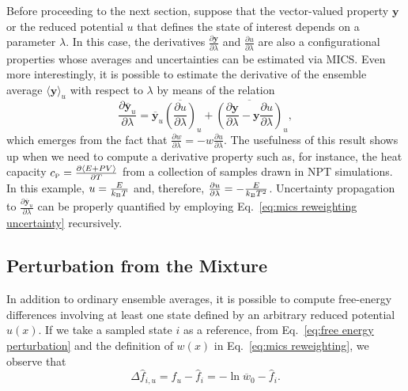 \documentclass[
    journal=jctcce,
    layout=twocolumn
]{achemso}
\newcommand{\vt}[1]{\boldsymbol{\mathbf{#1}}}   %
\newcommand{\avg}[1]{\overline{#1}}             %
\begin{document}
Before proceeding to the next section, suppose that the vector-valued property $\vt y$ or the reduced potential $u$ that defines the state of interest depends on a parameter $\lambda$. In this case, the derivatives $\frac{\partial \vt y}{\partial \lambda}$ and $\frac{\partial u}{\partial \lambda}$ are also a configurational properties whose averages and uncertainties can be estimated via MICS. Even more interestingly, it is possible to estimate the derivative of the ensemble average $\langle \vt y \rangle_u$ with respect to $\lambda$ by means of the relation
\begin{equation*}
\frac{\partial \avg{\vt y}_u}{\partial \lambda} = \avg{\vt y}_u \avg{\left(\frac{\partial u}{\partial \lambda}\right)}_u + \avg{\left(\frac{\partial \vt y}{\partial \lambda} - \vt y \frac{\partial u}{\partial \lambda} \right)}_u,
\end{equation*}
which emerges from the fact that $\frac{\partial w}{\partial \lambda} = - w \frac{\partial u}{\partial \lambda}$. The usefulness of this result shows up when we need to compute a derivative property such as, for instance, the heat capacity $c_\text{\tiny P} = \frac{\partial \langle E + PV \rangle}{\partial T}$ from a collection of samples drawn in NPT simulations. In this example, $u = \frac{E}{k_\text{\tiny B} T}$ and, therefore, $\frac{\partial u}{\partial \lambda} = -\frac{E}{k_\text{\tiny B} T^2}$. Uncertainty propagation to $\frac{\partial \avg{\vt y}_u}{\partial \lambda}$ can be properly quantified by employing Eq.~\eqref{eq:mics reweighting uncertainty} recursively.

\subsection{Perturbation from the Mixture}

In addition to ordinary ensemble averages, it is possible to compute free-energy differences involving at least one state defined by an arbitrary reduced potential $u(x)$. If we take a sampled state $i$ as a reference, from Eq.~\eqref{eq:free energy perturbation} and the definition of $w(x)$ in Eq.~\eqref{eq:mics reweighting}, we observe that
\begin{equation}
\label{eq:mics fep}
\Delta {\hat f}_{i,u} = {\hat f}_u - {\hat f}_i = -\ln \avg{w}_0 - {\hat f}_i.
\end{equation}
\end{document}
